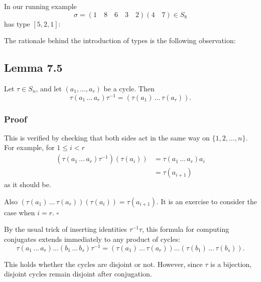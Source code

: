 In our running example
$$ \sigma = (1 \quad 8 \quad 6 \quad 3 \quad 2)(4 \quad 7) \in S_8 $$
has type $[5, 2, 1]$:

\begin{center}
\end{center}

\vspace{1em}
The rationale behind the introduction of types is the following observation:

\subsection*{Lemma 7.5}

Let $\tau \in S_n$, and let $(a_1, \dots, a_r)$ be a cycle. Then
$$ \tau (a_1 \, \dots \, a_r) \tau^{-1} = (\tau(a_1) \, \dots \, \tau(a_r)). $$

\subsubsection*{Proof}

This is verified by checking that both sides act in the same way on $\{1, 2, \dots, n\}$. For example, for $1 \leq i < r$
\begin{align*}
\left(\tau (a_1 \, \dots \, a_r) \tau^{-1}\right)(\tau(a_i)) &= \tau (a_1 \, \dots \, a_r) a_i \\
&= \tau(a_{i+1})
\end{align*}
as it should be.

Also $(\tau(a_1) \, \dots \, \tau(a_r))(\tau(a_i)) = \tau(a_{i+1})$. It is an exercise to consider the case when $i = r$.
\hfill $\square$

\vspace{1em}
By the usual trick of inserting identities $\tau^{-1} \tau$, this formula for computing conjugates extends immediately to any product of cycles:
$$ \tau (a_1 \, \dots \, a_r) \dots (b_1 \, \dots \, b_s) \tau^{-1} = (\tau(a_1) \, \dots \, \tau(a_r)) \dots (\tau(b_1) \, \dots \, \tau(b_s)). $$

This holds whether the cycles are disjoint or not. However, since $\tau$ is a bijection, disjoint cycles remain disjoint after conjugation.

